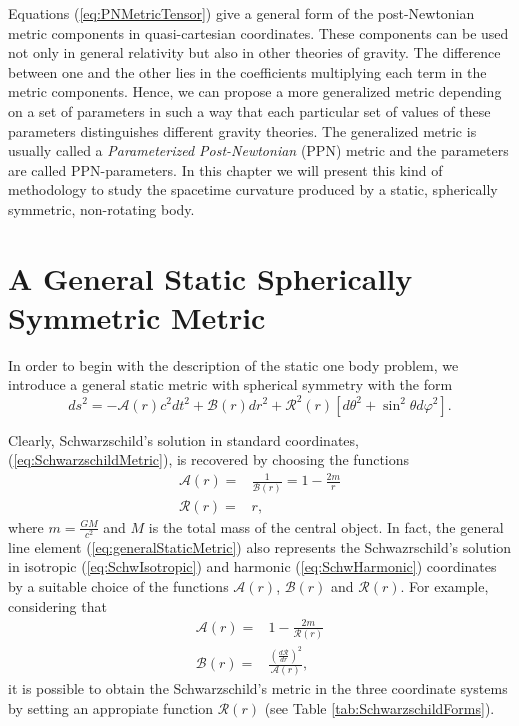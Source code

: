Equations (\ref{eq:PNMetricTensor}) give a general form of the post-Newtonian metric components in quasi-cartesian coordinates. These components can be used not only in general relativity but also in other theories of gravity. The difference between one and the other lies in the coefficients multiplying each term in the metric components. Hence, we can propose a more generalized metric depending on a set of parameters in such a way that each particular set of values of these parameters distinguishes different gravity theories. The generalized metric is usually called a \textit{Parameterized Post-Newtonian} (PPN) metric and the parameters are called PPN-parameters. In this chapter we will present this kind of methodology to study the spacetime curvature produced by a static, spherically symmetric, non-rotating body.

\section{A General Static Spherically Symmetric Metric}
In order to begin with the description of the static one body problem, we introduce a general static metric with spherical symmetry with the form
\begin{equation}
ds^2 = - \mathcal{A}(r) c^2 dt^2 + \mathcal{B}(r) dr^2 + \mathcal{R}^2(r) \left[ d\theta^2 + \sin^2 \theta d\varphi ^2 \right]. \label{eq:generalStaticMetric}
\end{equation}

Clearly, Schwarzschild's solution in standard coordinates, (\ref{eq:SchwarzschildMetric}), is recovered by choosing the functions 
\begin{align}
\mathcal{A}(r) = & \frac{1}{\mathcal{B}(r)} =1 -  \frac{2m}{r} \\
\mathcal{R}(r) = & r,
\end{align}
where $m = \frac{GM}{c^2}$ and $M$ is the total mass of the central object. In fact, the general line element (\ref{eq:generalStaticMetric}) also represents the Schwazrschild's solution in isotropic  (\ref{eq:SchwIsotropic}) and harmonic (\ref{eq:SchwHarmonic}) coordinates by a suitable choice of the functions $\mathcal{A}(r)$, $\mathcal{B}(r)$ and $\mathcal{R}(r)$. For example, considering that 
\begin{subequations}
\begin{align}
\mathcal{A}(r) =& 1 - \frac{2m}{\mathcal{R}(r)} \\
\mathcal{B}(r)=& \frac{\left( \frac{d\mathcal{R}}{dr}\right)^2}{\mathcal{A}(r)},
\end{align}
\end{subequations}
it is possible to obtain the Schwarzschild's metric in the three coordinate systems by setting an appropiate function $\mathcal{R}(r)$ (see Table \ref{tab:SchwarzschildForms}).

